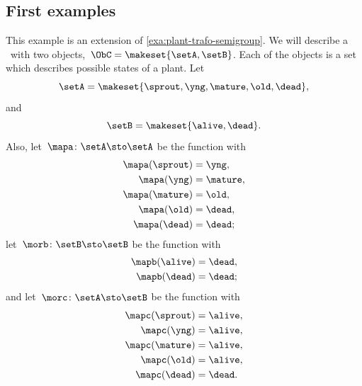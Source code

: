 \subsection{First examples}

    \begin{example}
    \label{exa:semicat-plant-states}
    This example is an extension of \cref{exa:plant-trafo-semigroup}.
    We will describe a ~\CatC with two objects,~$\ObC = \makeset{ \setA, \setB }$.
    Each of the objects is a set which describes possible states of a plant.
    Let
    \begin{equation}
        \setA = \makeset{ \sprout, \yng, \mature, \old, \dead },
    \end{equation}
    and
    \begin{equation}
        \setB = \makeset{ \alive, \dead }.
    \end{equation}
    Also, let~$\mapa \colon \setA \sto \setA$ be the function with
    \begin{equation}
        \begin{aligned}
            \mapa(\sprout) & = \yng, \\
            \mapa(\yng)    & = \mature, \\
            \mapa(\mature) & = \old, \\
            \mapa( \old)   & = \dead, \\
            \mapa(\dead)   & = \dead;
        \end{aligned}
    \end{equation}
    let~$\morb \colon \setB \sto \setB$ be the function with
    \begin{equation}
        \begin{aligned}
            \mapb(\alive) & = \dead, \\
            \mapb(\dead)  & = \dead;
        \end{aligned}
    \end{equation}
    and let~$\morc \colon \setA \sto \setB$ be the function with
    \begin{equation}
        \begin{aligned}
            \mapc(\sprout) & = \alive, \\
            \mapc(\yng)    & = \alive, \\
            \mapc(\mature) & = \alive, \\
            \mapc( \old)   & = \alive, \\
            \mapc (\dead)  & = \dead.
        \end{aligned}

\end{equation}
\end{example}
